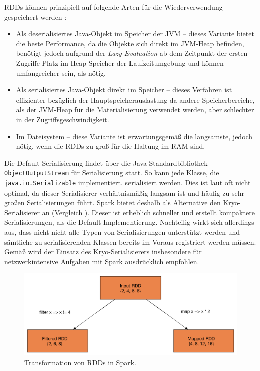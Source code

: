 RDDs können prinzipiell auf folgende Arten für die Wiederverwendung gespeichert werden :
\begin{itemize}
		\item Als deserialisiertes Java-Objekt im Speicher der JVM – dieses Variante bietet die beste Performance, da die Objekte sich direkt im JVM-Heap befinden, benötigt jedoch aufgrund der \textit{Lazy Evaluation} ab dem Zeitpunkt der ersten Zugriffe Platz im Heap-Speicher der Laufzeitumgebung und können umfangreicher sein, als nötig. 
		\item Als serialisiertes Java-Objekt direkt im Speicher – dieses Verfahren ist effizienter bezüglich der Hauptspeicherauslastung da andere Speicherbereiche, als der JVM-Heap für die Materialisierung verwendet werden, aber schlechter in der Zugriffsgeschwindigkeit.
		\item Im Dateisystem – diese Variante ist erwartungsgemäß die langsamste, jedoch nötig, wenn die RDDs zu groß für die Haltung im RAM sind. 		
\end{itemize}	

Die Default-Serialisierung findet über die Java Standardbibliothek \texttt{ObjectOutputStream} für Serialisierung statt. So kann jede Klasse, die \texttt{java.io.Serializable} implementiert, serialisiert werden. Dies ist laut   oft nicht optimal, da dieser Serialisierer verhältnismäßig langsam ist und häufig zu sehr großen Serialisierungen führt. Spark bietet deshalb als Alternative den Kryo-Serialisierer an (Vergleich ). Dieser ist erheblich schneller und erstellt kompaktere Serialisierungen, als die Default-Implementierung. Nachteilig wirkt sich allerdings aus, dass nicht nicht alle Typen von Serialisierungen unterstützt werden und sämtliche zu serialisierenden Klassen bereits im Voraus registriert werden müssen. Gemäß  wird der Einsatz des Kryo-Serialisierers insbesondere für netzwerkintensive Aufgaben mit Spark ausdrücklich empfohlen. 

  

\begin{figure}[htb!]
\centering
\includegraphics[width=1.0\textwidth]{bilder/transform.png}
\caption{Transformation von RDDs in Spark.}
\label{fig:sparktransform}
\end{figure} 



